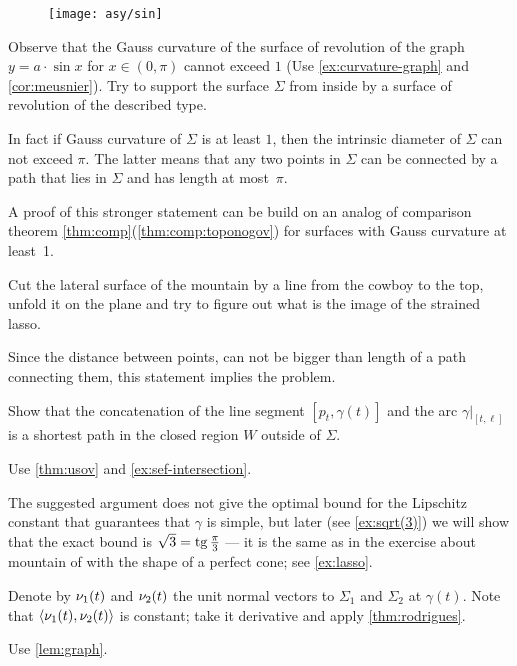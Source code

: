 \begin{figure}[h!]
\vskip-0mm
\centering
\texttt{[image: asy/sin]}
\vskip-0mm
\end{figure}

Observe that the Gauss curvature of the surface of revolution of the graph $y=a\cdot \sin x$ for $x\in(0,\pi)$ cannot exceed $1$ (Use \ref{ex:curvature-graph} and \ref{cor:meusnier}).
Try to support the surface $\Sigma$ from inside by a surface of revolution of the described type. 

In fact if Gauss curvature of $\Sigma$ is at least $1$,
then
the intrinsic diameter of $\Sigma$ can not exceed $\pi$.
The latter means that any two points in $\Sigma$ can be connected by a path that lies in $\Sigma$ and has length at most~$\pi$.

A proof of this stronger statement can be build on an analog of comparison theorem \ref{thm:comp}(\ref{thm:comp:toponogov}) for surfaces with Gauss curvature at least~1.

 Cut the lateral surface of the mountain by a line from the cowboy to the top, unfold it on the plane and try to figure out what is the image of the strained lasso.

Since the distance between points, can not be bigger than length of a path connecting them,
this statement implies the problem.


 Show that the concatenation of the line segment $[p_t,\gamma(t)]$ and the arc $\gamma|_{[t,\ell]}$ is a shortest path in the closed region $W$ outside of $\Sigma$.

 Use \ref{thm:usov} and \ref{ex:sef-intersection}.

The suggested argument does not give the optimal bound for the Lipschitz constant that guarantees that $\gamma$ is simple, but
later (see \ref{ex:sqrt(3)}) we will show that the exact bound is $\sqrt{3}=\operatorname{tg}\tfrac\pi3$ --- it is the same as in the exercise about mountain of with the shape of a perfect cone; see \ref{ex:lasso}.

  Denote by $\nu_1(t)$ and $\nu_2(t)$ the unit normal vectors to $\Sigma_1$ and $\Sigma_2$ at $\gamma(t)$.
Note that $\langle \nu_1(t),\nu_2(t)\rangle$ is constant; take it derivative and apply \ref{thm:rodrigues}.

 Use \ref{lem:graph}.

